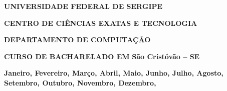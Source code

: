 \begin{titlepage}

\newcommand{\universidade}{UNIVERSIDADE FEDERAL DE SERGIPE}
\newcommand{\centro}{CENTRO DE CIÊNCIAS EXATAS E TECNOLOGIA}
\newcommand{\departamento}{DEPARTAMENTO DE COMPUTAÇÃO}
\newcommand{\curso}{CURSO DE BACHARELADO EM}

\newcommand{\cidade}{São Cristóvão -- SE}
\renewcommand{\today}{
	\ifcase \month 
		\or Janeiro,
		\or Fevereiro,
		\or Março,
		\or Abril,
		\or Maio,
		\or Junho,
		\or Julho,
		\or Agosto,
		\or Setembro,
		\or Outubro,
		\or Novembro,
		\or Dezembro,
	\fi
		\number \year} 


\begin{center}
{\textbf{\universidade}}
\par
{\textbf{\centro}}
\par
{\textbf{\departamento}}
\par
{\textbf{\curso}}
\vfill
{\textbf{\titulo}}
\vfill
{\textbf{\aluno}}
\vfill
{\textbf{\cidade}}
\par
{\textbf{\today}}
\end{center}
\end{titlepage}

